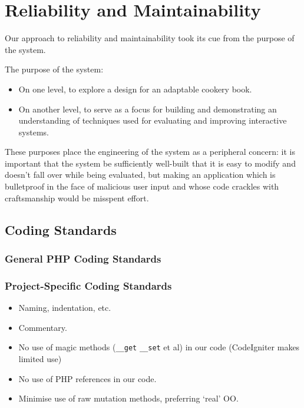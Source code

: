 \section{Reliability and Maintainability}

Our approach to reliability and maintainability took its cue from the
purpose of the system.

The purpose of the system:

\begin{itemize}
\item On one level, to explore a design for an adaptable cookery book.
\item On another level, to serve as a focus for building and
  demonstrating an understanding of techniques used for evaluating and
  improving interactive systems.
\end{itemize}

These purposes place the engineering of the system as a peripheral
concern: it is important that the system be sufficiently well-built
that it is easy to modify and doesn't fall over while being evaluated,
but making an application which is bulletproof in the face of
malicious user input and whose code crackles with craftsmanship would
be misspent effort.

\subsection{Coding Standards}

\subsubsection{General PHP Coding Standards}

\subsubsection{Project-Specific Coding Standards}

\begin{itemize}
\item Naming, indentation, etc.
\item Commentary.
\item No use of magic methods (\verb!__get! \verb!__set! et al) in our
  code (CodeIgniter makes limited use)
\item No use of PHP references in our code.
\item Minimise use of raw mutation methods, preferring `real' OO.
\end{itemize}

